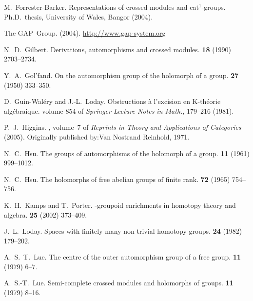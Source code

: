 \begin{thebibliography}{notesdev}
M.~Forrester-Barker.
\newblock Representations of crossed modules and cat$^1$-groups.
\newblock Ph.{D}.~thesis, University of Wales, Bangor (2004).

The GAP~Group.
 (2004).
\newline\urlprefix\url{http://www.gap-system.org}

N.~D.~Gilbert.
\newblock Derivations, automorphisms and crossed modules.
 {\bf 18} (1990) 2703--2734.

Y.~A.~Gol'fand.
\newblock On the automorphism group of the holomorph of a group.
 {\bf 27} (1950) 333--350.

D.~Guin-Wal\'ery and J.-L.~Loday.
\newblock Obstructions \`a l'excision en K-th\'eorie alg\'ebraique.
\newblock volume 854 of {\em Springer Lecture Notes in Math.\/}, 179--216
  (1981).

P.~J.~Higgins.
, volume~7 of {\em Reprints in Theory
  and Applications of Categories\/} (2005).
\newblock Originally published by:Van Nostrand Reinhold, 1971.

N.~C.~Hsu.
\newblock The groups of automorphisms of the holomorph of a group.
 {\bf 11} (1961) 999--1012.

N.~C.~Hsu.
\newblock The holomorphs of free abelian groups of finite rank.
 {\bf 72} (1965) 754--756.

K.~H.~Kamps and T.~Porter.
-groupoid enrichments in homotopy theory and algebra.
 {\bf 25} (2002) 373--409.

J.~L.~Loday.
\newblock Spaces with finitely many non-trivial homotopy groups.
 {\bf 24} (1982) 179--202.

A.~S.~T.~Lue.
\newblock The centre of the outer automorphism group of a free group.
 {\bf 11} (1979) 6--7.

A.~S.-T.~Lue.
\newblock Semi-complete crossed modules and holomorphs of groups.
 {\bf 11} (1979) 8--16.


\end{thebibliography}
